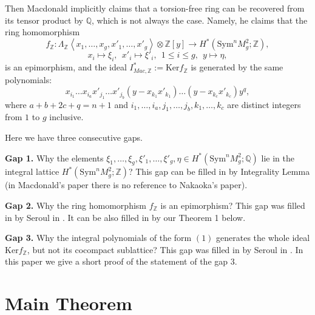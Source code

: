 \documentclass[a4paper,14pt]{article}
\newcommand{\Sym}{\mathrm{Sym}}
\newcommand{\Q}{\mathbb{Q}}
\newcommand{\Z}{\mathbb{Z}}
\begin{document}
Then Macdonald implicitly claims that a torsion-free ring can be recovered from its tensor product by $\Q$, which is not always the case. Namely, he claims that the ring homomorphism
$$
f_{\Z}: \Lambda_{\Z} \left< x_1,\ldots,x_g,x'_1,\ldots,x'_g \right>\otimes \Z[y] \to H^*(\Sym^n M^2_g;\Z),
$$
$$
x_i \mapsto \xi_i, \ \  x'_i \mapsto \xi'_i, \ \ 1\le i\le g, \ \ y \mapsto \eta,
$$
is an epimorphism, and the ideal $I^*_{Mac, \Z}:= \mathrm{Ker} f_{\Z}$ is generated by the same polynomials:
$$
x_{i_1}\ldots x_{i_a}x'_{j_1}\ldots x'_{j_b} (y - x_{k_1}x'_{k_1})\ldots  (y - x_{k_c}x'_{k_c}) y^q, 
$$
where $a+b+2c+ q=n+1$ and $i_1,\ldots,i_a,j_1,\ldots,j_b,k_1,\ldots,k_c$ are distinct integers from $1$ to $g$ inclusive.

Here we have three consecutive gaps. 

\textbf{Gap 1.} Why the elements $\xi_1,\ldots, \xi_g,\xi'_1,\ldots,\xi'_g, \eta \in H^*(\Sym^n M^2_g;\Q)$ lie in the integral lattice $H^*(\Sym^n M^2_g;\Z)$? This gap can be filled in by Integrality Lemma (in Macdonald's paper \cite{Mac1} there is no reference to Nakaoka's paper). 

\textbf{Gap 2.} Why the ring homomorphism $f_{\Z}$ is an epimorphism? This gap was filled in by Seroul in \cite{Ser}. It can be also filled in by our Theorem 1 below.

\textbf{Gap 3.} Why the integral polynomials of the form $(1)$ generates the whole ideal $\mathrm{Ker} f_{\Z}$, but not its cocompact sublattice? This gap was filled in by Seroul in \cite{Ser}. In this paper we give a short proof of the statement of the gap 3. 













\section{Main Theorem}
\end{document}
